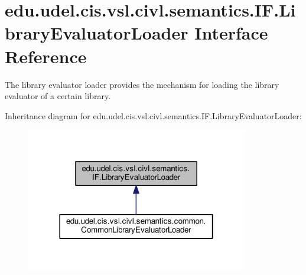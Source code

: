 \hypertarget{interfaceedu_1_1udel_1_1cis_1_1vsl_1_1civl_1_1semantics_1_1IF_1_1LibraryEvaluatorLoader}{}\section{edu.\+udel.\+cis.\+vsl.\+civl.\+semantics.\+I\+F.\+Library\+Evaluator\+Loader Interface Reference}
\label{interfaceedu_1_1udel_1_1cis_1_1vsl_1_1civl_1_1semantics_1_1IF_1_1LibraryEvaluatorLoader}


The library evaluator loader provides the mechanism for loading the library evaluator of a certain library.  




Inheritance diagram for edu.\+udel.\+cis.\+vsl.\+civl.\+semantics.\+I\+F.\+Library\+Evaluator\+Loader\+:
\nopagebreak
\begin{figure}[H]
\begin{center}
\leavevmode
\includegraphics[width=274pt]{interfaceedu_1_1udel_1_1cis_1_1vsl_1_1civl_1_1semantics_1_1IF_1_1LibraryEvaluatorLoader__inherit__graph}
\end{center}
\end{figure}
